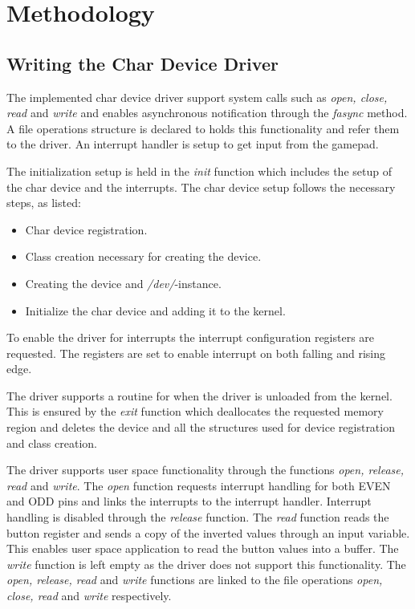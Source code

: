 \chapter{Methodology}

\section{Writing the Char Device Driver}


The implemented char device driver support system calls such as \emph{open, close, read} and \emph{write} and enables asynchronous notification through the \emph{fasync} method. A file operations structure is declared to holds this functionality and refer them to the driver. An interrupt handler is setup to get input from the gamepad. 

The initialization setup is held in the \emph{init} function which includes the setup of the char device and the interrupts. The char device setup follows the necessary steps, as listed:
\begin{itemize}
\item Char device registration.
\item Class creation necessary for creating the device.
\item Creating the device and \emph{/dev/}-instance.
\item Initialize the char device and adding it to the kernel.
\end{itemize}
To enable the driver for interrupts the interrupt configuration registers are requested. The registers are set to enable interrupt on both falling and rising edge. 

The driver supports a routine for when the driver is unloaded from the kernel.
This is ensured by the \emph{exit} function which deallocates the requested memory region and deletes the device and all the structures used for device registration and class creation.

The driver supports user space functionality through the functions \emph{open, release, read} and \emph{write}.
The \emph{open} function requests interrupt handling for both EVEN and ODD pins and links the interrupts to the interrupt handler. Interrupt handling is disabled through the \emph{release} function.
The \emph{read} function reads the button register and sends a copy of the inverted values through an input variable. This enables user space application to read the button values into a buffer. The \emph{write} function is left empty as the driver does not support this functionality.
The \emph{open, release, read} and \emph{write} functions are linked to the file operations \emph{open, close, read} and \emph{write} respectively.

